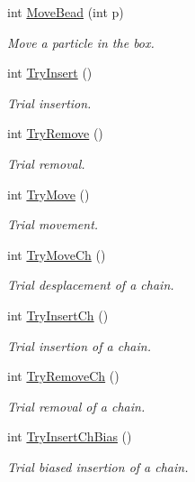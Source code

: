 \begin{DoxyCompactItemize}
int \hyperlink{classForces_aaa86df6dc24f47e52ca153db60bd6749}{Move\+Bead} (int p)
\begin{DoxyCompactList}\small\item\em Move a particle in the box. \end{DoxyCompactList}\item 
int \hyperlink{classForces_a56709cda842db1c6f3813acc5bca5237}{Try\+Insert} ()
\begin{DoxyCompactList}\small\item\em Trial insertion. \end{DoxyCompactList}\item 
int \hyperlink{classForces_a0658783c2d6dcab7a875f938747255a6}{Try\+Remove} ()
\begin{DoxyCompactList}\small\item\em Trial removal. \end{DoxyCompactList}\item 
int \hyperlink{classForces_ad69656acc46a08f2361dbe5b1067dffa}{Try\+Move} ()
\begin{DoxyCompactList}\small\item\em Trial movement. \end{DoxyCompactList}\item 
int \hyperlink{classForces_aa30016ca75ff4d48a905a9dad7da023f}{Try\+Move\+Ch} ()
\begin{DoxyCompactList}\small\item\em Trial desplacement of a chain. \end{DoxyCompactList}\item 
int \hyperlink{classForces_ab7bfa9d7122c69b311f666740653bd0b}{Try\+Insert\+Ch} ()
\begin{DoxyCompactList}\small\item\em Trial insertion of a chain. \end{DoxyCompactList}\item 
int \hyperlink{classForces_aefc3ccff8a9805e952ddc49194595844}{Try\+Remove\+Ch} ()
\begin{DoxyCompactList}\small\item\em Trial removal of a chain. \end{DoxyCompactList}\item 
int \hyperlink{classForces_a949d9de0a157e4258f88d5b5f322f74e}{Try\+Insert\+Ch\+Bias} ()
\begin{DoxyCompactList}\small\item\em Trial biased insertion of a chain. \end{DoxyCompactList}\item 

\end{DoxyCompactItemize}
